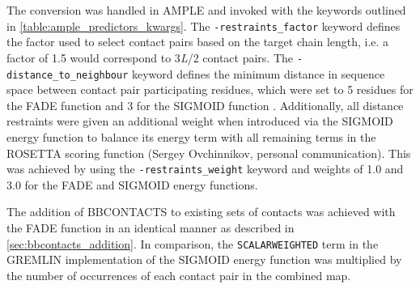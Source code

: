 The conversion was handled in AMPLE and invoked with the keywords outlined in \cref{table:ample_predictors_kwargs}. The \texttt{-restraints\_factor} keyword defines the factor used to select contact pairs based on the target chain length, i.e. a factor of 1.5 would correspond to 3\textit{L}/2 contact pairs. The \texttt{-distance\_to\_neighbour} keyword defines the minimum distance in sequence space between contact pair participating residues, which were set to 5 residues for the FADE function \cite{Michel2014-eg} and 3 for the SIGMOID function \cite{Ovchinnikov2015-tn}. Additionally, all distance restraints were given an additional weight when introduced via the SIGMOID energy function to balance its energy term with all remaining terms in the ROSETTA scoring function (Sergey Ovchinnikov, personal communication). This was achieved by using the \texttt{-restraints\_weight} keyword and weights of 1.0 and 3.0 for the FADE and SIGMOID energy functions.

The addition of BBCONTACTS to existing sets of contacts was achieved with the FADE function in an identical manner as described in \cref{sec:bbcontacts_addition}. In comparison, the \texttt{SCALARWEIGHTED} term in the GREMLIN implementation of the SIGMOID energy function \cite{Ovchinnikov2015-tn} was multiplied by the number of occurrences of each contact pair in the combined map.

